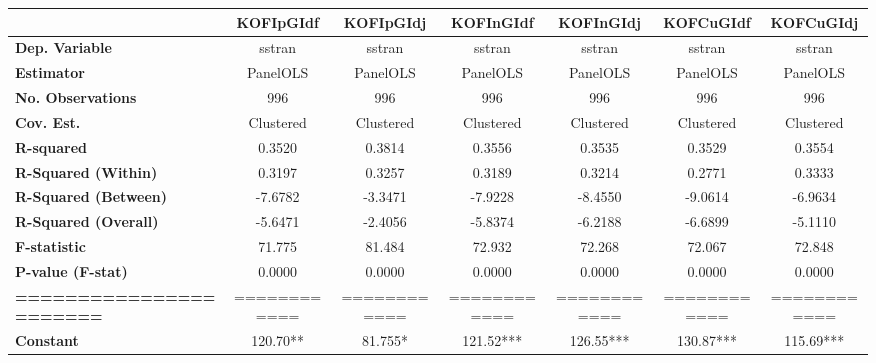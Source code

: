 \begin{center}
\begin{tabular}{lcccccc}
\toprule
                                   & \textbf{KOFIpGIdf} & \textbf{KOFIpGIdj} & \textbf{KOFInGIdf} & \textbf{KOFInGIdj} & \textbf{KOFCuGIdf} & \textbf{KOFCuGIdj}  \\
\midrule
\textbf{Dep. Variable}             &       sstran       &       sstran       &       sstran       &       sstran       &       sstran       &       sstran        \\
\textbf{Estimator}                 &      PanelOLS      &      PanelOLS      &      PanelOLS      &      PanelOLS      &      PanelOLS      &      PanelOLS       \\
\textbf{No. Observations}          &        996         &        996         &        996         &        996         &        996         &        996          \\
\textbf{Cov. Est.}                 &     Clustered      &     Clustered      &     Clustered      &     Clustered      &     Clustered      &     Clustered       \\
\textbf{R-squared}                 &       0.3520       &       0.3814       &       0.3556       &       0.3535       &       0.3529       &       0.3554        \\
\textbf{R-Squared (Within)}        &       0.3197       &       0.3257       &       0.3189       &       0.3214       &       0.2771       &       0.3333        \\
\textbf{R-Squared (Between)}       &      -7.6782       &      -3.3471       &      -7.9228       &      -8.4550       &      -9.0614       &      -6.9634        \\
\textbf{R-Squared (Overall)}       &      -5.6471       &      -2.4056       &      -5.8374       &      -6.2188       &      -6.6899       &      -5.1110        \\
\textbf{F-statistic}               &       71.775       &       81.484       &       72.932       &       72.268       &       72.067       &       72.848        \\
\textbf{P-value (F-stat)}          &       0.0000       &       0.0000       &       0.0000       &       0.0000       &       0.0000       &       0.0000        \\
\textbf{=======================}   &    ============    &    ============    &    ============    &    ============    &    ============    &    ============     \\
\textbf{Constant}                     &      120.70**      &      81.755*       &     121.52***      &     126.55***      &     130.87***      &     115.69***       \\

\end{tabular}
\end{center}
